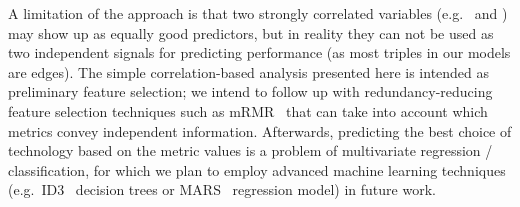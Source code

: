 A limitation of the approach is that two strongly correlated variables (e.g.\ 
 and ) may show up as equally good
predictors, but in reality they can not be used as two independent signals for
predicting performance (as most triples in our models are edges). The simple
correlation-based analysis presented here is intended as preliminary feature
selection; we intend to follow up with redundancy-reducing feature selection
techniques such as mRMR~\cite{mRMR-1453511} that can take into account which
metrics convey independent information. Afterwards, predicting the best choice
of technology based on the metric values is a problem of multivariate regression
/ classification, for which we plan to employ advanced machine learning
techniques (e.g.\ ID3~\cite{ID3-quinlan-1986} decision trees or
MARS~\cite{MARS-MR1091842} regression model) in future work.

